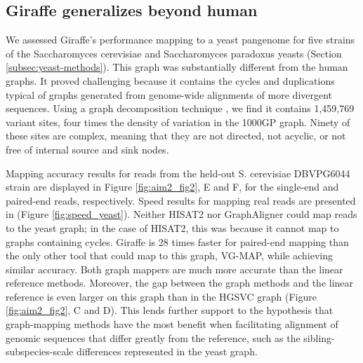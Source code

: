 \documentclass[11pt]{ucscthesis}
\begin{document}
\subsection{Giraffe generalizes beyond human}
We assessed Giraffe’s performance mapping to a yeast pangenome for five strains of the Saccharomyces cerevisiae and Saccharomyces paradoxus yeasts (Section \ref{subsec:yeast-methods}).
This graph was substantially different from the human graphs.
It proved challenging because it contains the cycles and duplications typical of graphs generated from genome-wide alignments of more divergent sequences.
Using a graph decomposition technique \cite{paten_superbubbles_2018}, we find it contains 1,459,769 variant sites, four times the density of variation in the 1000GP graph.
Ninety of these sites are complex, meaning that they are not directed, not acyclic, or not free of internal source and sink nodes.

Mapping accuracy results for reads from the held-out S. cerevisiae DBVPG6044 strain are displayed in Figure \ref{fig:aim2_fig2}, E and F, for the single-end and paired-end reads, respectively.
Speed results for mapping real reads are presented in (Figure \ref{fig:speed_yeast}).
Neither HISAT2 nor GraphAligner could map reads to the yeast graph; in the case of HISAT2, this was because it cannot map to graphs containing cycles.
Giraffe is 28 times faster for paired-end mapping than the only other tool that could map to this graph, VG-MAP, while achieving similar accuracy.
Both graph mappers are much more accurate than the linear reference methods.
Moreover, the gap between the graph methods and the linear reference is even larger on this graph than in the HGSVC graph (Figure \ref{fig:aim2_fig2}, C and D).
This lends further support to the hypothesis that graph-mapping methods have the most benefit when facilitating alignment of genomic sequences that differ greatly from the reference, such as the sibling-subspecies-scale differences represented in the yeast graph.
\end{document}
